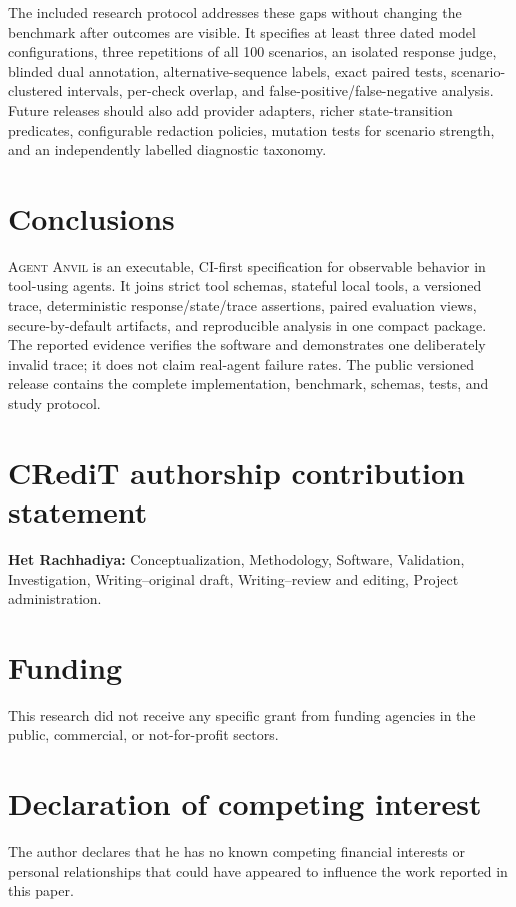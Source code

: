 \documentclass[preprint,12pt]{elsarticle}
\newcommand{\system}{\textsc{Agent Anvil}}
\begin{document}
The included research protocol addresses these gaps without changing the benchmark after outcomes are visible. It specifies at least three dated model configurations, three repetitions of all 100 scenarios, an isolated response judge, blinded dual annotation, alternative-sequence labels, exact paired tests, scenario-clustered intervals, per-check overlap, and false-positive/false-negative analysis. Future releases should also add provider adapters, richer state-transition predicates, configurable redaction policies, mutation tests for scenario strength, and an independently labelled diagnostic taxonomy.

\section{Conclusions}

\system{} is an executable, CI-first specification for observable behavior in tool-using agents. It joins strict tool schemas, stateful local tools, a versioned trace, deterministic response/state/trace assertions, paired evaluation views, secure-by-default artifacts, and reproducible analysis in one compact package. The reported evidence verifies the software and demonstrates one deliberately invalid trace; it does not claim real-agent failure rates. The public versioned release contains the complete implementation, benchmark, schemas, tests, and study protocol.

\section*{CRediT authorship contribution statement}

\textbf{Het Rachhadiya:} Conceptualization, Methodology, Software, Validation, Investigation, Writing--original draft, Writing--review and editing, Project administration.

\section*{Funding}

This research did not receive any specific grant from funding agencies in the public, commercial, or not-for-profit sectors.

\section*{Declaration of competing interest}

The author declares that he has no known competing financial interests or personal relationships that could have appeared to influence the work reported in this paper.
\end{document}
